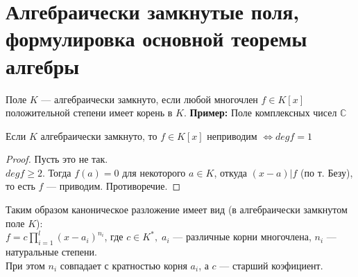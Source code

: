 \section{Алгебраически замкнутые поля, формулировка основной теоремы алгебры}

\begin{conj}
    Поле $K$ --- алгебраически замкнуто, если любой многочлен $f \in K[x]$
    положительной степени имеет корень в $K$.
    \textbf{Пример:} Поле комплексных чисел $\mathbb{C}$
\end{conj}

\begin{theorem-non}
    Если $K$ алгебраически замкнуто, то $f \in K[x]$ неприводим $\Longleftrightarrow deg f = 1$
    \begin{proof}
        Пусть это не так. \\
        $deg f \geqslant 2.$ Тогда $f(a) = 0$ для некоторого $a \in K$, откуда $(x - a) | f$ (по т. Безу),
        то есть $f$ --- приводим. Противоречие.
    \end{proof}
\end{theorem-non}

Таким образом каноническое разложение имеет вид (в алгебраически замкнутом поле $K$): \\
$f = c \prod_{i = 1}^{l} (x - a_i)^{n_i}$, где $c \in K^*,\; a_i$ --- различные корни многочлена,
$n_i$ --- натуральные степени. \\
При этом $n_i$ совпадает с кратностью корня $a_i$, а $c$ --- старший коэфициент.
